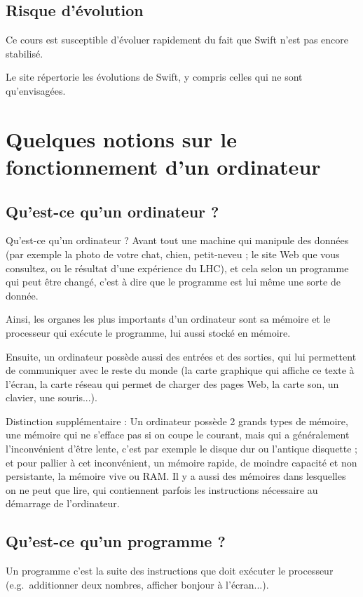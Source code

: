 \subsection{Risque d’évolution}
Ce cours est susceptible d'évoluer rapidement du fait que Swift n'est pas encore stabilisé.

Le site
répertorie les évolutions de Swift,
y compris celles qui ne sont qu’envisagées.
\section{Quelques notions sur le fonctionnement d'un ordinateur}
\subsection{Qu'est-ce qu'un ordinateur ?}
Qu'est-ce qu'un ordinateur ? Avant tout une machine qui manipule des données (par
exemple la photo de votre chat, chien, petit-neveu ; le site Web que vous consultez, ou le
résultat d'une expérience du LHC), et cela selon un programme qui peut être changé,
c'est à dire que le programme est lui même une sorte de donnée.

Ainsi, les organes les plus importants d'un ordinateur sont sa mémoire et le processeur
qui exécute le programme, lui aussi stocké en mémoire.

Ensuite, un ordinateur possède aussi des entrées et des sorties, qui lui permettent de
communiquer avec le reste du monde (la carte graphique qui affiche ce texte à l'écran, la
carte réseau qui permet de charger des pages Web, la carte son, un clavier, une souris...).

Distinction supplémentaire : Un ordinateur possède 2 grands types de mémoire, une
mémoire qui ne s'efface pas si on coupe le courant, mais qui a généralement
l'inconvénient d'être lente, c'est par exemple le disque dur ou l'antique disquette ; et pour
pallier à cet inconvénient, un mémoire rapide, de moindre capacité et non persistante, la
mémoire vive ou RAM. Il y a aussi des mémoires dans lesquelles on ne peut que lire, qui
contiennent parfois les instructions nécessaire au démarrage de l'ordinateur.
\subsection{Qu'est-ce qu'un programme ?}
Un programme c'est la suite des instructions que doit exécuter le processeur
(e.g.\ additionner deux nombres, afficher bonjour à l'écran...).

